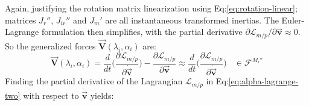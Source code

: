 Again, justifying the rotation matrix linearization using Eq:\ref{eq:rotation-linear}; matrices $J_r''$, $J_{ir}''$ and $J_m'$ are all instantaneous transformed inertias. The Euler-Lagrange formulation then simplifies, with the partial derivative $\partial\mathcal{L}_{m/p}/\partial\vec{\mathbf{v}}\approx 0$. So the generalized forces $\vec{\mathbf{V}}(\lambda_i,\alpha_i)$ are:
\begin{equation}
\vec{\mathbf{V}}(\lambda_i,\alpha_i)=\frac{d}{dt}\Bigg(\frac{\partial\mathcal{L}_{m/p}}{\partial\dot{\vec{\mathbf{v}}}}\Bigg)-\frac{\partial\mathcal{L}_{m/p}}{\partial\vec{\mathbf{v}}}\approx\frac{d}{dt}\Bigg(\frac{\partial\mathcal{L}_{m/p}}{\partial\dot{\vec{\mathbf{v}}}}\Bigg)~~~~\in\mathcal{F}^{M_i''}
\end{equation}
Finding the partial derivative of the Lagrangian $\mathcal{L}_{m/p}$ in Eq:\ref{eq:alpha-lagrange-two} with respect to $\dot{\vec{\mathbf{v}}}$ yields:
